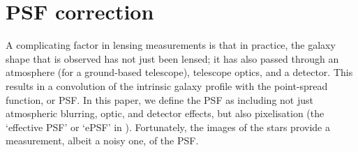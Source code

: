 \documentclass[twocolumn,useAMS,usenatbib]{mn2e}
\begin{document}


\section{PSF correction}\label{S:psfcorrection}

A complicating factor in lensing measurements is that in practice, the galaxy shape that is observed has not just been
lensed; it has also passed through an atmosphere (for a ground-based
telescope), telescope optics, and a detector.  This results in a
convolution of the intrinsic galaxy profile with the point-spread
function, or PSF.  In this paper, we
define the PSF as including not just atmospheric blurring, optic, and
detector effects, but also pixelisation (the `effective PSF' or `ePSF'
 in \citealt{2002AJ....123..583B}).  Fortunately, the images of
the stars provide a measurement, albeit a noisy one, of the PSF.
\end{document}
